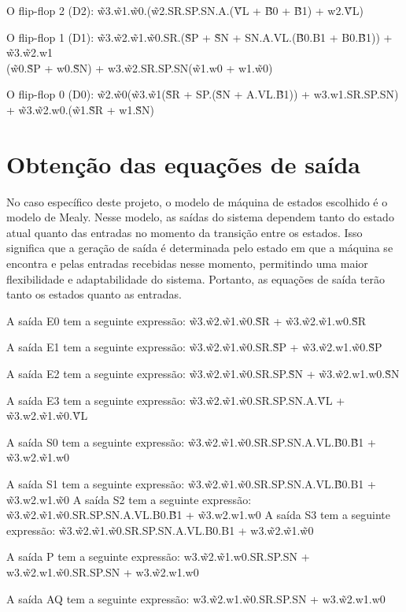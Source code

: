 O flip-flop 2 (D2): \~w3.\~w1.\~w0.(\~w2.SR.SP.SN.A.(\~VL + \~B0 + \~B1) + w2.\~VL)

O flip-flop 1 (D1): \~w3.\~w2.\~w1.\~w0.SR.(\~SP + \~SN + SN.A.VL.(\~B0.B1 + B0.\~B1)) + \~w3.\~w2.w1\\(\~w0.\~SP + w0.\~SN) + w3.\~w2.SR.SP.SN(\~w1.w0 + w1.\~w0)

O flip-flop 0 (D0): \~w2.\~w0(\~w3.\~w1(\~SR + SP.(\~SN + A.VL.\~B1)) + w3.w1.SR.SP.SN) + \~w3.\~w2.w0.(\~w1.\~SR + w1.\~SN)

\section{Obtenção das equações de saída}

No caso específico deste projeto, o modelo de máquina de estados escolhido é o modelo de Mealy. Nesse modelo, as saídas do sistema dependem tanto do estado atual quanto das entradas no momento da transição entre os estados. Isso significa que a geração de saída é determinada pelo estado em que a máquina se encontra e pelas entradas recebidas nesse momento, permitindo uma maior flexibilidade e adaptabilidade do sistema. Portanto, as equações de saída terão tanto os estados quanto as entradas.

A saída E0 tem a seguinte expressão: \~w3.\~w2.\~w1.\~w0.\~SR + \~w3.\~w2.\~w1.w0.\~SR		

A saída E1 tem a seguinte expressão: \~w3.\~w2.\~w1.\~w0.SR.\~SP + \~w3.\~w2.w1.\~w0.\~SP	

A saída E2 tem a seguinte expressão: \~w3.\~w2.\~w1.\~w0.SR.SP.\~SN + \~w3.\~w2.w1.w0.\~SN								

A saída E3 tem a seguinte expressão: \~w3.\~w2.\~w1.\~w0.SR.SP.SN.A.\~VL + \~w3.w2.\~w1.\~w0.\~VL	

A saída S0 tem a seguinte expressão: \~w3.\~w2.\~w1.\~w0.SR.SP.SN.A.VL.\~B0.\~B1 + \~w3.w2.\~w1.w0		

A saída S1 tem a seguinte expressão: \~w3.\~w2.\~w1.\~w0.SR.SP.SN.A.VL.\~B0.B1 + \~w3.w2.w1.\~w0								
A saída S2 tem a seguinte expressão: \~w3.\~w2.\~w1.\~w0.SR.SP.SN.A.VL.B0.\~B1 + \~w3.w2.w1.w0								
A saída S3 tem a seguinte expressão: \~w3.\~w2.\~w1.\~w0.SR.SP.SN.A.VL.B0.B1 + w3.\~w2.\~w1.\~w0	

A saída P tem a seguinte expressão:	w3.\~w2.\~w1.w0.SR.SP.SN + w3.\~w2.w1.\~w0.SR.SP.SN + w3.\~w2.w1.w0								

A saída AQ tem a seguinte expressão: w3.\~w2.w1.\~w0.SR.SP.SN + w3.\~w2.w1.w0								

